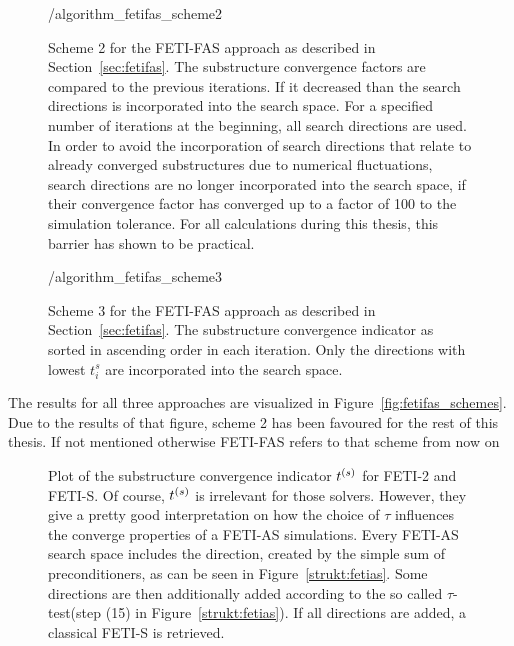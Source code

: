 \begin{figure}[h!]
  \begin{center}
    {\tikzpath/algorithm_fetifas_scheme2}
    \caption[Structogram FETI-FAS scheme 1]{Scheme 2 for the FETI-FAS approach as described in Section~\ref{sec:fetifas}. The substructure convergence factors are compared to the previous iterations. If it decreased than the search directions is incorporated into the search space. For a specified number of iterations at the beginning, all search directions are used. In order to avoid the incorporation of search directions that relate to already converged substructures due to numerical fluctuations, search directions are no longer incorporated into the search space, if their convergence factor has converged up to a factor of 100 to the simulation tolerance. For all calculations during this thesis, this barrier has shown to be practical.}
    \label{strukt:fetifas_scheme1}
  \end{center}
\end{figure}

\begin{figure}[h!]
  \begin{center}
    {\tikzpath/algorithm_fetifas_scheme3}
    \caption[Structogram FETI-FAS scheme 1]{Scheme 3 for the FETI-FAS approach as described in Section~\ref{sec:fetifas}. The substructure convergence indicator as sorted in ascending order in each iteration. Only the directions with lowest $t_i^s$ are incorporated into the search space.}
    \label{strukt:fetifas_scheme1}
  \end{center}
\end{figure}

The results for all three approaches are visualized in Figure~\ref{fig:fetifas_schemes}. Due to the results of that figure, scheme 2 has been favoured for the rest of this thesis. If not mentioned otherwise FETI-FAS refers to that scheme from now on

\begin{figure}[h!]
  \begin{center}
    
    \caption[Development of convergence indicator during FETI-2 and FETI-S iterations]{Plot of the substructure convergence indicator ${t}^{(s)}$ for FETI-2 and FETI-S. Of course, ${t}^{(s)}$ is irrelevant for those solvers. However, they give a pretty good interpretation on how the choice of $\tau$ influences the converge properties of a FETI-AS simulations. Every FETI-AS search space includes the direction, created by the simple sum of preconditioners, as can be seen in Figure~\ref{strukt:fetias}. Some directions are then additionally added according to the so called $\tau$-test(step (15) in Figure~\ref{strukt:fetias}). If all directions are added, a classical FETI-S is retrieved.}
    \label{fig:ts_development}
  \end{center}
\end{figure}



